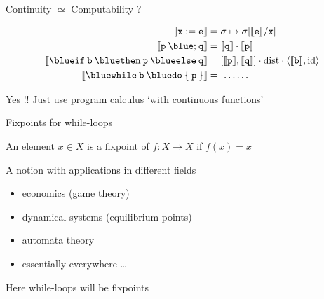 \documentclass{beamer}
\begin{document}
\begin{frame}{ Continuity $\simeq$ Computability ?} 

        \begin{align*}
                \sem{\prog{x : = e}} & = \sigma \mapsto \sigma[\sem{\prog{e}}/\prog{x}] \\
                \sem{\prog{p} \> {\blue ;} \> \prog{q}} & 
                = \sem{\prog{q}} \comp \sem{\prog{p}} \\
                \sem{\mathtt{{\blue if} \> b \> {\blue then} \> p \> {\blue else} \> q}}
                                                        & 
                                                        = [\sem{\prog{p}},\sem{\prog{q}}] \comp
                                                        \mathrm{dist} \comp \pv{\sem{\prog{b}}}{\id}
                \\
                \sem{\mathtt{{\blue while} \> b \> {\blue do} \> \{ \> p \> \}} }
                                                        & =\  \dots \dots
        \end{align*}

        \vfill
        \begin{center}
        \end{center}
        \pause
        Yes !! Just use \alert{\underline{program calculus}} `with
        \alert{\underline{continuous}} functions'
\end{frame}

\begin{frame}{Fixpoints for while-loops}

        \begin{definition}
                An element $x \in X$ is a \alert{\underline{fixpoint}} of $f :
                X \to X$ if $f(x) = x$
        \end{definition}

        A notion with applications in different fields
        \begin{itemize}
                \item economics (game theory)
                \item dynamical systems (equilibrium points)
                \item automata theory
                \item essentially everywhere \dots
        \end{itemize}

        \pause
        \smallskip
        Here while-loops will be fixpoints
\end{frame}
\end{document}

